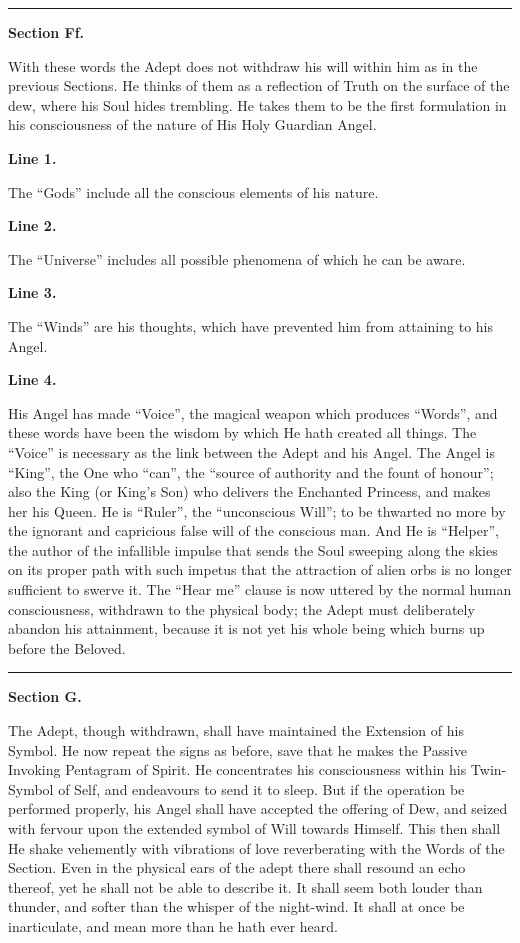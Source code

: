 {\centering
\rule{1in}{0.5pt}
\par}

\pagebreak[1]
\textbf{Section Ff.}


With these words the Adept does not withdraw his will within him as in the previous Sections. He thinks of them as a reflection of Truth on the surface of the dew, where his Soul hides trembling. He takes them to be the first formulation in his consciousness of the nature of His Holy Guardian Angel.


\textbf{Line 1.}


The \enquote{Gods} include all the conscious elements of his nature.


\textbf{Line 2.}


The \enquote{Universe} includes all possible phenomena of which he can be aware.


\textbf{Line 3.}


The \enquote{Winds} are his thoughts, which have prevented him from attaining to his Angel.


\textbf{Line 4.}


His Angel has made \enquote{Voice}, the magical weapon which produces \enquote{Words}, and these words have been the wisdom by which He hath created all things. The \enquote{Voice} is necessary as the link between the Adept and his Angel. The Angel is \enquote{King}, the One who \enquote{can}, the \enquote{source of authority and the fount of honour}; also the King (or King's Son) who delivers the Enchanted Princess, and makes her his Queen. He is \enquote{Ruler}, the \enquote{unconscious Will}; to be thwarted no more by the ignorant and capricious false will of the conscious man. And He is \enquote{Helper}, the author of the infallible impulse that sends the Soul sweeping along the skies on its proper path with such impetus that the attraction of alien orbs is no longer sufficient to swerve it. The \enquote{Hear me} clause is now uttered by the normal human consciousness, withdrawn to the physical body; the Adept must deliberately abandon his attainment, because it is not yet his whole being which burns up before the Beloved.


{\centering
\rule{1in}{0.5pt}
\par}

\pagebreak[1]
\textbf{Section G.}


The Adept, though withdrawn, shall have maintained the Extension of his Symbol. He now repeat the signs as before, save that he makes the Passive Invoking Pentagram of Spirit. He concentrates his consciousness within his Twin-Symbol of Self, and endeavours to send it to sleep. But if the operation be performed properly, his Angel shall have accepted the offering of Dew, and seized with fervour upon the extended symbol of Will towards Himself. This then shall He shake vehemently with vibrations of love reverberating with the Words of the Section. Even in the physical ears of the adept there shall resound an echo thereof, yet he shall not be able to describe it. It shall seem both louder than thunder, and softer than the whisper of the night-wind. It shall at once be inarticulate, and mean more than he hath ever heard.

